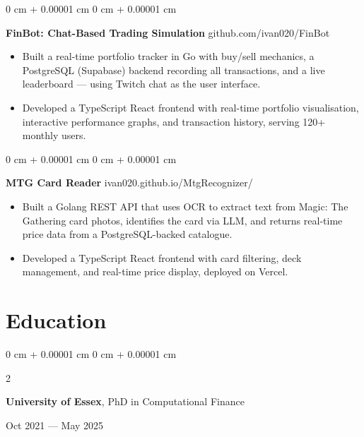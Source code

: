 \documentclass[6pt, letterpaper]{article}
\newenvironment{highlights}{
    \begin{itemize}[
        topsep=0.03 cm,
        parsep=0.03 cm,
        partopsep=0pt,
        itemsep=0pt,
        leftmargin=0 cm + 10pt
    ]
}{
    \end{itemize}
} %
\newenvironment{onecolentry}{
    \begin{adjustwidth}{
        0 cm + 0.00001 cm
    }{
        0 cm + 0.00001 cm
    }
}{
    \end{adjustwidth}
} %
\newenvironment{twocolentry}[2][]{
    \onecolentry
    \def\secondColumn{#2}
    \setcolumnwidth{\fill, 4.5 cm}
    \begin{paracol}{2}
}{
    \switchcolumn \raggedleft \secondColumn
    \end{paracol}
    \endonecolentry
} %
\begin{document}
    \begin{onecolentry}
        \textbf{FinBot: Chat-Based Trading Simulation} \hfill github.com/ivan020/FinBot

        \begin{highlights}

            \item Built a real-time portfolio tracker in Go with buy/sell mechanics, a PostgreSQL (Supabase) backend recording all transactions, and a live leaderboard — using Twitch chat as the user interface.
            \item Developed a TypeScript React frontend with real-time portfolio visualisation, interactive performance graphs, and transaction history, serving 120+ monthly users.

        \end{highlights}
    \end{onecolentry}

    \begin{onecolentry}
        \textbf{MTG Card Reader} \hfill ivan020.github.io/MtgRecognizer/

        \begin{highlights}

            \item Built a Golang REST API that uses OCR to extract text from Magic: The Gathering card photos, identifies the card via LLM, and returns real-time price data from a PostgreSQL-backed catalogue.
            \item Developed a TypeScript React frontend with card filtering, deck management, and real-time price display, deployed on Vercel.

        \end{highlights}
    \end{onecolentry}

    \section{Education}

            \begin{twocolentry}{
                Oct 2021 --- May 2025
            }
            \textbf{University of Essex}, PhD in Computational Finance
            \end{twocolentry}
\end{document}
